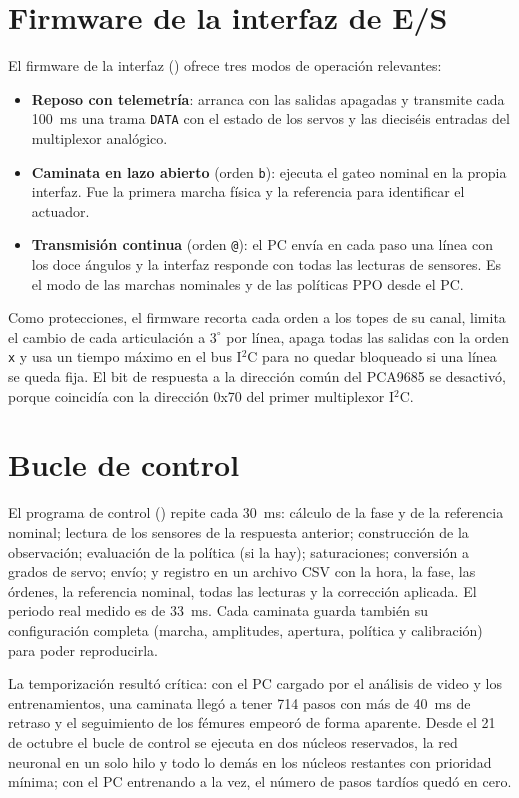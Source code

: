 \section{Firmware de la interfaz de E/S}

El firmware de la interfaz () ofrece tres
modos de operación relevantes:
\begin{itemize}
    \item \textbf{Reposo con telemetría}: arranca con las salidas apagadas y
    transmite cada 100~ms una trama \texttt{DATA} con el estado de los servos y
    las dieciséis entradas del multiplexor analógico.
    \item \textbf{Caminata en lazo abierto} (orden \texttt{b}): ejecuta el gateo
    nominal en la propia interfaz. Fue la primera marcha física y la referencia para
    identificar el actuador.
    \item \textbf{Transmisión continua} (orden \texttt{@}): el PC envía en cada
    paso una línea con los doce ángulos y la interfaz responde con todas las
    lecturas de sensores. Es el modo de las marchas nominales y de las políticas
    PPO desde el PC.
\end{itemize}
Como protecciones, el firmware recorta cada orden a los topes de su canal,
limita el cambio de cada articulación a $3^\circ$ por línea, apaga todas las
salidas con la orden \texttt{x} y usa un tiempo máximo en el bus I$^2$C para no
quedar bloqueado si una línea se queda fija. El bit de respuesta a la dirección
común del PCA9685 se desactivó, porque coincidía con la dirección 0x70 del
primer multiplexor I$^2$C.

\section{Bucle de control}

El programa de control () repite cada 30~ms: cálculo de la
fase y de la referencia nominal; lectura de los sensores de la respuesta
anterior; construcción de la observación; evaluación de la política (si la hay);
saturaciones; conversión a grados de servo; envío; y registro en un archivo CSV
con la hora, la fase, las órdenes, la referencia nominal, todas las lecturas y la
corrección aplicada. El periodo real medido es de 33~ms. Cada caminata guarda
también su configuración completa (marcha, amplitudes, apertura, política y
calibración) para poder reproducirla.

La temporización resultó crítica: con el PC cargado por el análisis de video y
los entrenamientos, una caminata llegó a tener 714 pasos con más de 40~ms de
retraso y el seguimiento de los fémures empeoró de forma aparente. Desde el 21
de octubre el bucle de control se ejecuta en dos núcleos reservados, la red
neuronal en un solo hilo y todo lo demás en los núcleos restantes con
prioridad mínima; con el PC entrenando a la vez, el número de pasos tardíos
quedó en cero.

